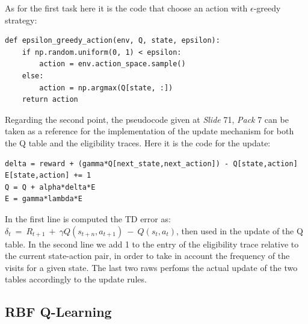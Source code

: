 \documentclass[10pt,a4paper]{article}
\begin{document}
\noindent As for the first task here it is the code that choose an action with $\epsilon$-greedy strategy:
\begin{lstlisting}
def epsilon_greedy_action(env, Q, state, epsilon):
    if np.random.uniform(0, 1) < epsilon:
        action = env.action_space.sample()  
    else:
        action = np.argmax(Q[state, :])
    return action
\end{lstlisting}
\vspace{5pt}

\noindent Regarding the second point, the pseudocode given at \textit{Slide} 71, \textit{Pack} 7 can be taken as a reference for the implementation of the update mechanism for both the Q table and the eligibility traces. Here it is the code for the update:
\begin{lstlisting}
delta = reward + (gamma*Q[next_state,next_action]) - Q[state,action]
E[state,action] += 1
Q = Q + alpha*delta*E
E = gamma*lambda*E
\end{lstlisting}
In the first line is computed the TD error as: $\delta_t  \:=\: R_{t+1} \:+\: \gamma Q(s_{t+n}, a_{t+1}) \:-\: Q(s_t, a_t)$, then used in the update of the Q table. In the second line we add 1 to the entry of the eligibility trace relative to the current state-action pair, in order to take in account the frequency of the visits for a given state. The last two raws perfoms the actual update of the two tables accordingly to the update rules.

\subsection{RBF Q-Learning}

\newpage
\end{document}

